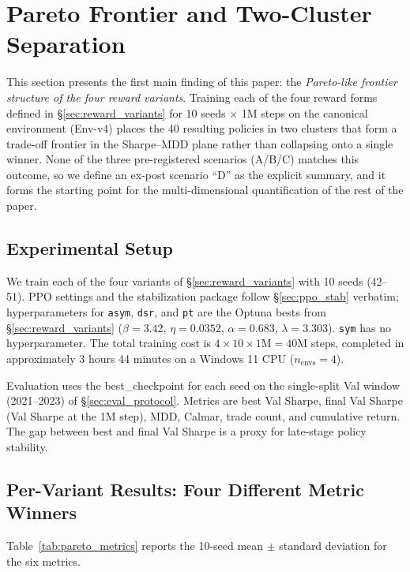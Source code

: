 \documentclass[11pt, a4paper]{article}
\begin{document}
\section{Pareto Frontier and Two-Cluster Separation}
\label{sec:pareto}

This section presents the first main finding of this paper: the
\emph{Pareto-like frontier structure of the four reward variants}. Training
each of the four reward forms defined in \S\ref{sec:reward_variants} for
10 seeds $\times$ 1M steps on the canonical environment (Env-v4) places the
40 resulting policies in two clusters that form a trade-off frontier in the
Sharpe--MDD plane rather than collapsing onto a single winner. None of the
three pre-registered scenarios (A/B/C) matches this outcome, so we define an
ex-post scenario ``D'' as the explicit summary, and it forms the starting point
for the multi-dimensional quantification of the rest of the paper.

\subsection{Experimental Setup}
\label{sec:pareto_setup}

We train each of the four variants of \S\ref{sec:reward_variants} with 10
seeds (42--51). PPO settings and the stabilization package follow
\S\ref{sec:ppo_stab} verbatim; hyperparameters for \texttt{asym}, \texttt{dsr},
and \texttt{pt} are the Optuna bests from \S\ref{sec:reward_variants}
($\beta=3.42$, $\eta=0.0352$, $\alpha=0.683$, $\lambda=3.303$). \texttt{sym}
has no hyperparameter. The total training cost is $4 \times 10 \times 1\mathrm{M}
= 40$M steps, completed in approximately 3 hours 44 minutes on a Windows 11
CPU ($n_{\text{envs}}=4$).

Evaluation uses the best\_checkpoint for each seed on the single-split Val
window (2021--2023) of \S\ref{sec:eval_protocol}. Metrics are best Val Sharpe,
final Val Sharpe (Val Sharpe at the 1M step), MDD, Calmar, trade count, and
cumulative return. The gap between best and final Val Sharpe is a proxy for
late-stage policy stability.

\subsection{Per-Variant Results: Four Different Metric Winners}
\label{sec:pareto_per_variant}

Table~\ref{tab:pareto_metrics} reports the 10-seed mean $\pm$ standard
deviation for the six metrics.
\end{document}
